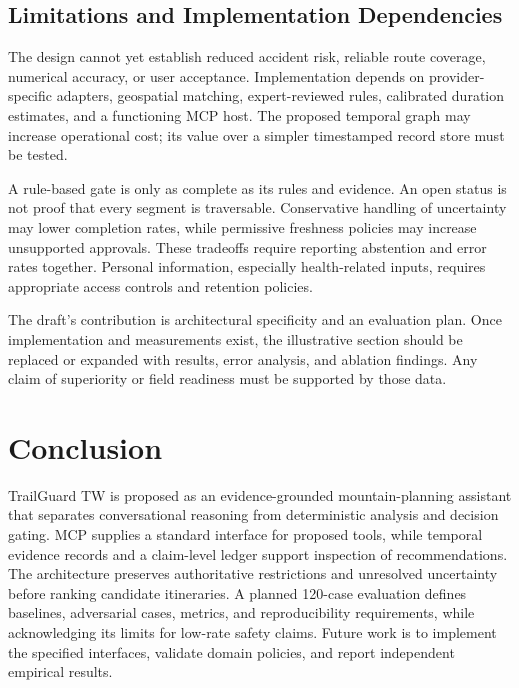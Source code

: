 \documentclass[conference]{IEEEtran}
\begin{document}
\subsection{Limitations and Implementation Dependencies}
The design cannot yet establish reduced accident risk, reliable route coverage, numerical accuracy, or user acceptance. Implementation depends on provider-specific adapters, geospatial matching, expert-reviewed rules, calibrated duration estimates, and a functioning MCP host. The proposed temporal graph may increase operational cost; its value over a simpler timestamped record store must be tested.

A rule-based gate is only as complete as its rules and evidence. An open status is not proof that every segment is traversable. Conservative handling of uncertainty may lower completion rates, while permissive freshness policies may increase unsupported approvals. These tradeoffs require reporting abstention and error rates together. Personal information, especially health-related inputs, requires appropriate access controls and retention policies.

The draft's contribution is architectural specificity and an evaluation plan. Once implementation and measurements exist, the illustrative section should be replaced or expanded with results, error analysis, and ablation findings. Any claim of superiority or field readiness must be supported by those data.

\section{Conclusion}
TrailGuard TW is proposed as an evidence-grounded mountain-planning assistant that separates conversational reasoning from deterministic analysis and decision gating. MCP supplies a standard interface for proposed tools, while temporal evidence records and a claim-level ledger support inspection of recommendations. The architecture preserves authoritative restrictions and unresolved uncertainty before ranking candidate itineraries. A planned 120-case evaluation defines baselines, adversarial cases, metrics, and reproducibility requirements, while acknowledging its limits for low-rate safety claims. Future work is to implement the specified interfaces, validate domain policies, and report independent empirical results.
\end{document}
